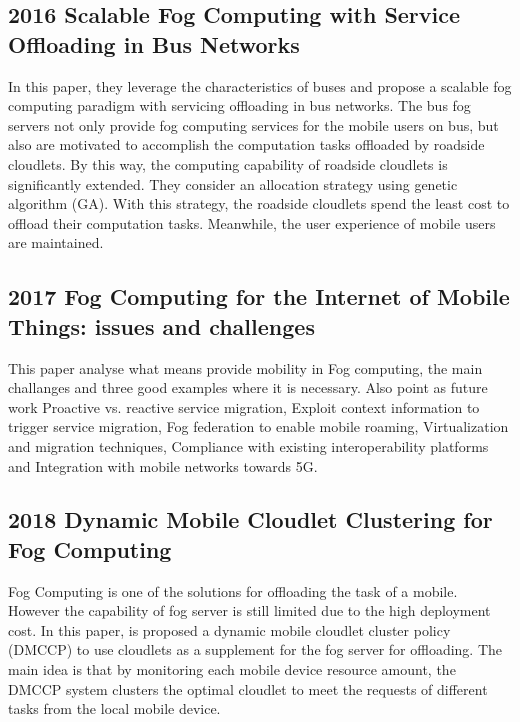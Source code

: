 \subsection{2016 Scalable Fog Computing with Service Offloading in Bus Networks}
\label{subsec:paper22} \cite{ye2016scalable}
In this paper, they leverage the characteristics of buses and propose a scalable fog computing paradigm with servicing offloading in bus networks. The bus fog servers not only provide fog computing services for the mobile users on bus, but also are motivated to accomplish the computation tasks offloaded by roadside cloudlets. By this way, the computing capability of roadside cloudlets is significantly extended. They consider an allocation strategy using genetic algorithm (GA). With this strategy, the roadside cloudlets spend the least cost to offload their computation tasks. Meanwhile, the user experience of mobile users are maintained.

\subsection{2017 Fog Computing for the Internet of Mobile Things: issues and challenges}
\label{subsec:paper22} \cite{puliafito2017fog}
This paper analyse what means provide mobility in Fog computing, the main challanges and three good examples where it is necessary. Also point as future work Proactive vs. reactive service migration, Exploit context information to trigger service migration, Fog federation to enable mobile roaming, Virtualization and migration techniques, Compliance with existing interoperability platforms and Integration with mobile networks towards 5G.

\subsection{2018 Dynamic Mobile Cloudlet Clustering for Fog Computing}
\label{subsec:paper22} \cite{lidynamic}
Fog Computing is one of the solutions for offloading the task of a mobile. However the capability of fog server is still limited due to the high deployment cost. In this paper, is proposed a dynamic mobile cloudlet cluster policy (DMCCP) to use cloudlets as a supplement for the fog server for offloading. The main idea is that by monitoring each mobile device resource amount, the DMCCP system clusters the optimal cloudlet to meet the requests of different tasks from the local mobile device.





